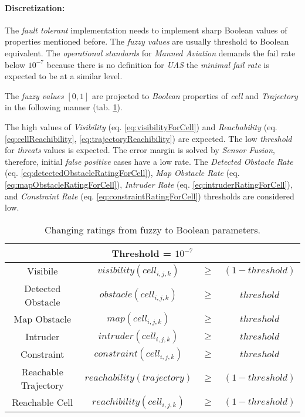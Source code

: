\paragraph{Discretization:} The \emph{fault tolerant} implementation needs to implement sharp Boolean values of properties mentioned before. The \emph{fuzzy values} are usually threshold to Boolean equivalent. The \emph{operational standards} for \emph{Manned Aviation} \cite{icao4444} demands the fail rate below $10^{-7}$ because there is no definition for \emph{UAS} the \emph{minimal fail rate} is expected to be at a similar level.

The \emph{fuzzy values} $[0,1]$ are projected to \emph{Boolean} properties of \emph{cell} and \emph{Trajectory} in the following manner (tab. \ref{tab:defuzificationRatings}).


The high values of \emph{Visibility} (eq. \ref{eq:visibilityForCell}) and \emph{Reachability} (eq. \ref{eq:cellReachibility}, \ref{eq:trajectoryReachibility}) are expected. The low \emph{threshold} for \emph{threats} values is expected. The error margin is solved by \emph{Sensor Fusion}, therefore, initial \emph{false positive} cases have a low rate. The \emph{Detected Obstacle Rate} (eq. \ref{eq:detectedObstacleRatingForCell}), \emph{Map Obstacle Rate} (eq. \ref{eq:mapObstacleRatingForCell}), \emph{Intruder Rate} (eq. \ref{eq:intruderRatingForCell}), and \emph{Constraint Rate} (eq. \ref{eq:constraintRatingForCell}) thresholds are considered low.

\begin{table}[H]
    \centering
    \begin{tabular}{c|ccc}
        \multicolumn{4}{c}{Threshold = $10^{-7}$}\\\hline\hline
        Visibile & $visibility(cell_{i,j,k})$&$\ge$&$(1-threshold)$ \\\hline
        Detected Obstacle &  $obstacle(cell_{i,j,k}) $&$ \ge $&$ threshold$\\\hline
        Map Obstacle &  $map(cell_{i,j,k})$&$\ge$&$threshold$\\\hline
        Intruder &  $intruder(cell_{i,j,k})$&$\ge$&$threshold$\\\hline
        Constraint &  $constraint(cell_{i,j,k})$&$\ge$&$threshold$\\\hline\hline
        Reachable Trajectory &  $reachability(trajectory)$&$\ge$&$(1-threshold)$\\\hline
        Reachable Cell &  $reachibility(cell_{i,j,k})$&$\ge$&$(1-threshold)$
    \end{tabular}
    \caption{Changing ratings from fuzzy to Boolean parameters.}
    \label{tab:defuzificationRatings}
\end{table}

